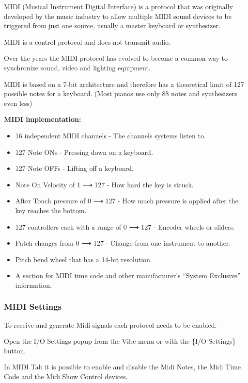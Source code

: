 \documentclass[
]{article}
\begin{document}
MIDI (Musical Instrument Digital Interface) is a protocol that was originally developed by the music industry to allow multiple MIDI sound devices to be triggered from just one source, usually a master keyboard or synthesizer.

MIDI is a control protocol and does not transmit audio.

Over the years the MIDI protocol has evolved to become a common way to synchronize sound, video and lighting equipment.

MIDI is based on a 7-bit architecture and therefore has a theoretical limit of 127 possible notes for a keyboard. (Most pianos use only 88 notes and synthesizers even less)

\textbf{MIDI implementation:}

\begin{itemize}
\item
  16 independent MIDI channels - The channels systems listen to.
\item
  127 Note ONs - Pressing down on a keyboard.
\item
  127 Note OFFs - Lifting off a keyboard.
\item
  Note On Velocity of 1 ⟶ 127 - How hard the key is struck.
\item
  After Touch pressure of 0 ⟶ 127 - How much pressure is applied after the key reaches the bottom.
\item
  127 controllers each with a range of 0 ⟶ 127 - Encoder wheels or sliders.
\item
  Patch changes from 0 ⟶ 127 - Change from one instrument to another.
\item
  Pitch bend wheel that has a 14-bit resolution.
\item
  A section for MIDI time code and other manufacturer's ``System Exclusive'' information.
\end{itemize}

\hypertarget{midi-settings}{%
\subsubsection{MIDI Settings}\label{midi-settings}}

To receive and generate Midi signals each protocol needs to be enabled.

Open the I/O Settings popup from the Vibe menu or with the \{I/O Settings\} button.

In MIDI Tab it is possible to enable and disable the Midi Notes, the Midi Time Code and the Midi Show Control devices.
\end{document}
